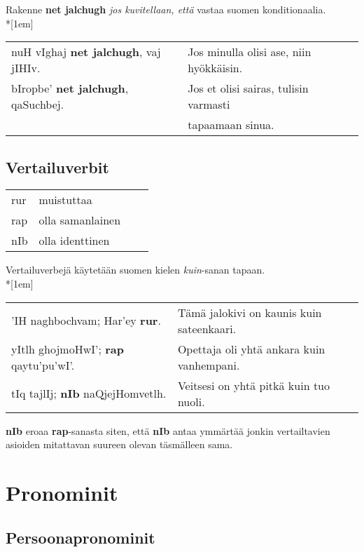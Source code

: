 \documentclass{book}
\begin{document}
Rakenne \textbf{net jalchugh} \textit{jos kuvitellaan, että} vastaa suomen konditionaalia.\\*[1em]
\begin{tabular}{l l}
    nuH vIghaj \textbf{net jalchugh}, vaj jIHIv. & Jos minulla olisi ase, niin hyökkäisin. \\
    bIropbe' \textbf{net jalchugh}, qaSuchbej. & Jos et olisi sairas, tulisin varmasti \\ & tapaamaan sinua. \\
\end{tabular}

\section{Vertailuverbit}
\label{sec:vertailuverbit}

\begin{tabular}{Bl Il}
    rur & muistuttaa \\
    rap & olla samanlainen \\
    nIb & olla identtinen \\
\end{tabular}

Vertailuverbejä käytetään suomen kielen \textit{kuin}-sanan tapaan.\\*[1em]
\begin{tabular}{l l}
    'IH naghbochvam; Har'ey \textbf{rur}. & Tämä jalokivi on kaunis kuin sateenkaari. \\
    yItlh ghojmoHwI'; \textbf{rap} qaytu'pu'wI'. & Opettaja oli yhtä ankara kuin vanhempani. \\
    tIq tajlIj; \textbf{nIb} naQjejHomvetlh. & Veitsesi on yhtä pitkä kuin tuo nuoli. \\
\end{tabular}

\textbf{nIb} eroaa \textbf{rap}-sanasta siten, että \textbf{nIb} antaa ymmärtää jonkin vertailtavien asioiden mitattavan suureen olevan täsmälleen sama.

\chapter{Pronominit}

\section{Persoonapronominit}
\end{document}
